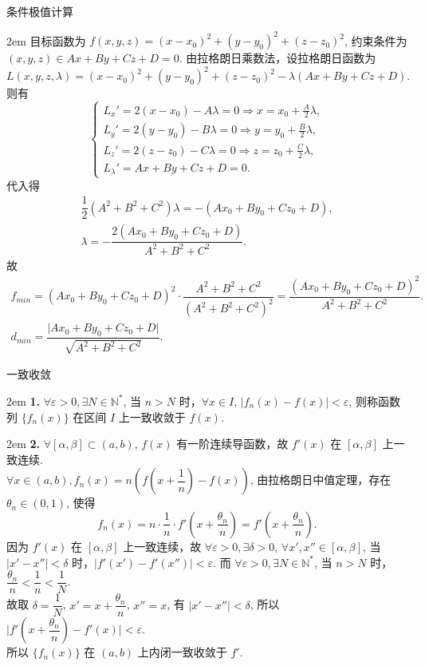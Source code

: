 \documentclass[UTF8,14pt,normal]{ctexart}
\begin{document}
 条件极值计算

    \hangindent 2em
    \noindent
    目标函数为 \(f(x, y, z) = (x - x_0)^2 + (y - y_0)^2 + (z - z_0)^2\), 约束条件为 \((x, y, z) \in Ax + By + Cz + D = 0\). 由拉格朗日乘数法，设拉格朗日函数为
    \[
        L(x, y, z, \lambda) = (x - x_0)^2 + (y - y_0)^2 + (z - z_0)^2 - \lambda(Ax + By + Cz + D).
    \]
    则有
    \[
        \begin{cases}
            L_x' = 2(x - x_0) - A \lambda = 0 \Rightarrow x = x_0 + \frac{A}{2} \lambda, \\
            L_y' = 2(y - y_0) - B \lambda = 0 \Rightarrow y = y_0 + \frac{B}{2} \lambda, \\
            L_z' = 2(z - z_0) - C \lambda = 0 \Rightarrow z = z_0 + \frac{C}{2} \lambda, \\
            L_{\lambda}' = Ax + By + Cz + D = 0.
        \end{cases}
    \]
    代入得 
    \begin{gather*}
        \dfrac{1}{2} (A^2 + B^2 + C^2) \lambda = -(Ax_0 + By_0 + Cz_0 + D), \\
        \lambda = -\dfrac{2(Ax_0 + By_0 + Cz_0 + D)}{A^2 + B^2 + C^2}.
    \end{gather*}
    故
    \begin{gather*}
        f_{min} = (Ax_0 + By_0 + Cz_0 + D)^2 \cdot \dfrac{A^2 + B^2 + C^2}{(A^2 + B^2 + C^2)^2} = \dfrac{(Ax_0 + By_0 + Cz_0 + D)^2}{A^2 + B^2 + C^2}. \\
        d_{min} = \dfrac{\lvert Ax_0 + By_0 + Cz_0 + D \rvert}{\sqrt{A^2 + B^2 + C^2}}.
    \end{gather*}

 一致收敛

    \hangindent 2em
    \noindent
    \textbf{1.} \(\forall \varepsilon > 0, \exists N \in \mathbb{N^*}\), 当 \(n > N\) 时，\(\forall x \in I\), \(\lvert f_n(x) - f(x) \rvert < \varepsilon\), 则称函数列 \(\{f_n(x)\}\) 在区间 \(I\) 上一致收敛于 \(f(x)\).

    \hangindent 2em
    \noindent
    \textbf{2.} \(\forall [\alpha, \beta] \subset (a, b)\), \(f(x)\) 有一阶连续导函数，故 \(f'(x)\) 在 \([\alpha, \beta]\) 上一致连续. \\
    \(\forall x \in (a, b), f_n(x) = n(f(x + \dfrac{1}{n}) - f(x))\), 由拉格朗日中值定理，存在 \(\theta_n \in (0, 1)\), 使得
    \[
        f_n(x) = n \cdot \frac{1}{n} \cdot f'(x + \frac{\theta_n}{n}) = f'(x + \frac{\theta_n}{n}).
    \]
    因为 \(f'(x)\) 在 \([\alpha, \beta]\) 上一致连续，故 \(\forall \varepsilon > 0, \exists \delta > 0\), \(\forall x', x'' \in [\alpha, \beta]\), 当 \(\lvert x' - x'' \rvert < \delta\) 时，\(\lvert f'(x') - f'(x'') \rvert < \varepsilon\). 而 \(\forall \varepsilon > 0, \exists N \in \mathbb{N^*}\), 当 \(n > N\) 时，\(\dfrac{\theta_n}{n} < \dfrac{1}{n} < \dfrac{1}{N}\). \\
    故取 \(\delta = \dfrac{1}{N}\), \(x' = x + \dfrac{\theta_n}{n}\), \(x'' = x\), 有 \(\lvert x' - x'' \rvert < \delta\), 所以 \(\lvert f'(x + \dfrac{\theta_n}{n}) - f'(x) \rvert < \varepsilon\). \\
    所以 \(\{f_n(x)\}\) 在 \((a, b)\) 上内闭一致收敛于 \(f'\).
\end{document}
